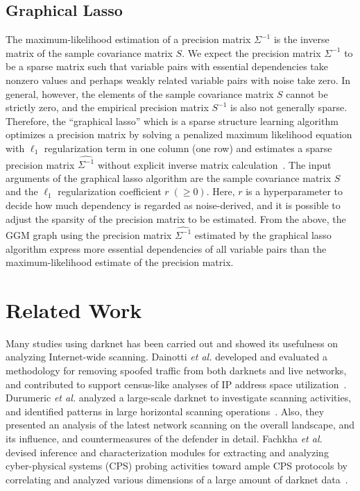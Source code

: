 \documentclass[conference]{IEEEtran}
\begin{document}
\subsection{Graphical Lasso}
The maximum-likelihood estimation of a precision matrix $\Sigma^{-1}$ is the inverse matrix of the sample covariance matrix $S$.
We expect the precision matrix $\Sigma^{-1}$ to be a sparse matrix such that variable pairs with essential dependencies take nonzero values and perhaps weakly related variable pairs with noise take zero.
In general, however, the elements of the sample covariance matrix $S$ cannot be strictly zero, and the empirical precision matrix $S^{-1}$ is also not generally sparse.
Therefore, the ``graphical lasso'' which is a sparse structure learning algorithm optimizes a precision matrix by solving a penalized maximum likelihood equation with $\ell_1$ regularization term in one column (one row) and estimates a sparse precision matrix $\hat{\Sigma^{-1}}$ without explicit inverse matrix calculation~\cite{Friedman}.
The input arguments of the graphical lasso algorithm are the sample covariance matrix $S$ and the $\ell_1$ regularization coefficient $r\;(\geq 0)$.
Here, $r$ is a hyperparameter to decide how much dependency is regarded as noise-derived, and it is possible to adjust the sparsity of the precision matrix to be estimated.
From the above, the GGM graph using the precision matrix $\hat{\Sigma^{-1}}$ estimated by the graphical lasso algorithm express more essential dependencies of all variable pairs than the maximum-likelihood estimate of the precision matrix.



\section{Related Work}
Many studies using darknet has been carried out and showed its usefulness on analyzing Internet-wide scanning.
Dainotti {\it et al.} developed and evaluated a methodology for removing spoofed traffic from both darknets and live networks, and contributed to support census-like analyses of IP address space utilization~\cite{Dainotti}.
Durumeric {\it et al.} analyzed a large-scale darknet to investigate scanning activities, and identified patterns in large horizontal scanning operations~\cite{Durumeric}.
Also, they presented an analysis of the latest network scanning on the overall landscape, and its influence, and countermeasures of the defender in detail.
Fachkha {\it et al.} devised inference and characterization modules for extracting and analyzing cyber-physical systems (CPS) probing activities toward ample CPS protocols by correlating and analyzed various dimensions of a large amount of darknet data~\cite{Fachkha}.
\end{document}

